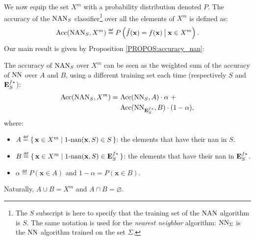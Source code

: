 We now equip the set $X^m$ with a probability distribution denoted $P$.  The
accuracy of the $\mbox{NAN}_S$ classifier\footnote{The $S$ subscript is here to
specify that the training set of the $\mbox{NAN}$ algorithm is $S$. The same notation
is used for the \textit{nearest neighbor} algorithm: $\text{NN}_\Sigma$ is the $\text{NN}$
algorithm trained on the set $\Sigma$.} over all the elements of $X^m$ is
defined as:
$$\acc(\NAN_S, X^m)\eqdef P\left(\hat{f}(\mathbf{x})=f(\mathbf{x}) \given[\big]
\mathbf{x} \in X^m\right).$$
Our main result is given by Proposition \ref{PROPOS:accuracy_nan}:
\begin{proposition}
  \label{PROPOS:accuracy_nan}
  The accuracy of $\mbox{NAN}_S$ over $X^m$ can be seen as the weighted sum of the
  accuracy of $\text{NN}$ over $A$ and $B$, using a different training set each time
  (respectively $S$ and $\mathbf{E}_{S}^{f*}$):
  \begin{align*}
    \mbox{Acc}(\mbox{NAN}_S, X^m) = ~&\mbox{Acc}(\text{NN}_S, A) \cdot \alpha ~ + \\
                        &\mbox{Acc}(\text{NN}_{\mathbf{E}_{S}^{f*}}, B) \cdot (1 - \alpha),
  \end{align*}
  where:
  \begin{itemize}
  \item $A \eqdef \set{\mathbf{x} \in X^m | \nan(\mathbf{x}, S) \in S}$: the
    elements that have their nan in $S$.
  \item $B \eqdef \set{\mathbf{x} \in X^m | \nan(\mathbf{x}, S) \in \esfs}$: the
    elements that have their nan in $\mathbf{E}_{S}^{f*}$.
  \item $\alpha \eqdef P(\mathbf{x} \in A)$ and $1 - \alpha = P(\mathbf{x} \in
    B)$. 
  \end{itemize}
  Naturally, $A \cup B = X^m$ and $A \cap B = \varnothing$.
\end{proposition}
